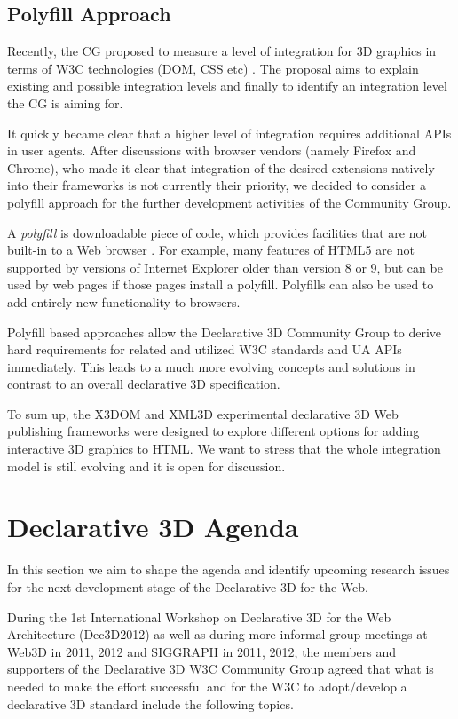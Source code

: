 \documentclass[review]{acmsiggraph}
\begin{document}
\subsection{Polyfill Approach}

Recently, the CG proposed to measure a level of integration for 3D graphics in terms of W3C technologies (DOM, CSS etc) \cite{Dec3D-LevelsOfIntegration}. The proposal aims to explain existing and possible integration levels and finally to identify an integration level the CG is aiming for.

It quickly became clear that a higher level of integration requires additional APIs in user agents. After discussions with browser vendors (namely Firefox and Chrome), who made it clear that integration of the desired extensions natively into their frameworks is not currently their priority, we decided to consider a polyfill approach for the further development activities of the Community Group.

A \textit{polyfill} is downloadable piece of code, which provides facilities that are not built-in to a Web browser \cite{Sharp2010}. For example, many features of HTML5 are not supported by versions of Internet Explorer older than version 8 or 9, but can be used by web pages if those pages install a polyfill. Polyfills can also be used to add entirely new functionality to browsers.

Polyfill based approaches allow the Declarative 3D Community Group to derive hard requirements for related and utilized W3C standards and UA APIs immediately. This leads to a much more evolving concepts and solutions in contrast to an overall declarative 3D specification.

To sum up, the X3DOM and XML3D experimental declarative 3D Web publishing frameworks were designed to explore different options for adding interactive 3D graphics to HTML. We want to stress that the whole integration model is still evolving and it is open for discussion.


\section{Declarative 3D Agenda}

In this section we aim to shape the agenda and identify upcoming research issues for the next development stage of the Declarative 3D for the Web.

\label{sec:Agenda}
During the 1st International Workshop on Declarative 3D for the Web Architecture (Dec3D2012) \cite{Dec3D2012} as well as during more informal group meetings at Web3D in 2011, 2012 and SIGGRAPH in 2011, 2012, the members and supporters of the Declarative 3D W3C Community Group agreed that what is needed to make the effort successful and for the W3C to adopt/develop a declarative 3D standard include the following topics.
\end{document}
